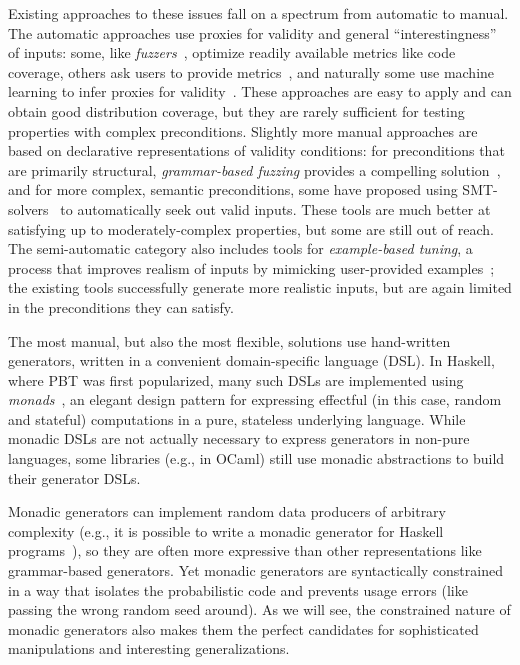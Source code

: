 Existing approaches to these issues
fall on a spectrum from automatic to manual. The automatic approaches use
proxies for validity and general ``interestingness'' of inputs: some, like {\em
fuzzers}~\cite{afl-readme}, optimize readily available metrics like code
coverage, others ask users to provide metrics~\cite{loscher2017targetedpbt}, and
naturally some use machine learning to infer proxies for
validity~\cite{godefroid2017learn, DBLP:conf/icse/ReddyLPS20}. These approaches
are easy to apply and can obtain good distribution coverage, but they are rarely
sufficient for testing properties with complex preconditions. Slightly more
manual approaches are based on declarative representations of validity
conditions: for preconditions that are primarily structural, {\em grammar-based
fuzzing} provides a compelling solution~\cite{godefroid2008grammar,
holler2012fuzzing, veggalam2016ifuzzer, wang2019superion,
srivastava2021gramatron}, and for more complex, semantic preconditions, some
have proposed using SMT-solvers~\cite{dewey2017automated, LuckPOPL,
steinhofel2022input} to automatically seek out valid inputs. These tools are
much better at satisfying up to moderately-complex properties, but some are
still out of reach. The semi-automatic
category also includes tools for {\em example-based tuning}, a process that
improves realism of inputs by mimicking user-provided
examples~\cite{soremekun2020inputs}; the existing tools successfully generate
more realistic inputs, but are again limited in the preconditions they can
satisfy.

\iflater{}\fi
The most manual, but also the most flexible, solutions use hand-written
generators, written in a convenient domain-specific language (DSL).
In  Haskell, where PBT was
first popularized, many such DSLs are implemented using {\em
monads\/}~\cite{moggi1991notions}, an elegant design pattern for
expressing effectful (in this case, random and stateful) computations
in a pure, stateless underlying
language. While monadic DSLs are not actually necessary to express generators in
non-pure languages, some libraries (e.g., in OCaml) still use monadic
abstractions to build their generator DSLs.

Monadic generators can implement random data producers of arbitrary complexity
(e.g., it is possible to write a monadic generator for Haskell
programs~\cite{palka_testing_2011}), so they are often more expressive than
other representations like grammar-based generators.  Yet monadic generators are
syntactically constrained in a way that isolates the probabilistic code and
prevents usage errors (like passing the wrong random seed around). As we will
see, the constrained nature of monadic generators also makes them the perfect
candidates for sophisticated manipulations and interesting generalizations.

